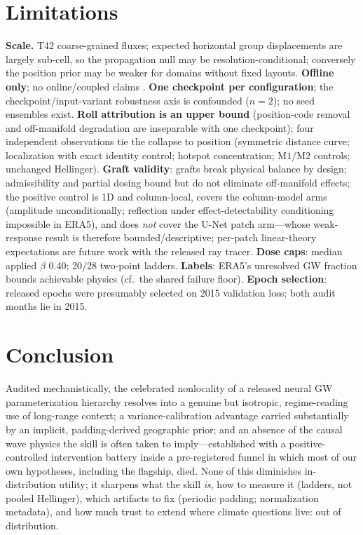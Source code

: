 \documentclass[10pt,twocolumn]{article}
\newcommand{\Mone}{\mathrm{M1}}
\newcommand{\Mtwo}{\mathrm{M2}}
\begin{document}
\section{Limitations}\label{sec:limits}
\textbf{Scale.} T42 coarse-grained fluxes; expected horizontal group displacements are largely sub-cell, so the propagation null may be resolution-conditional; conversely the position prior may be weaker for domains without fixed layouts. \textbf{Offline only}; no online/coupled claims \citep{pahlavan2024}. \textbf{One checkpoint per configuration}; the checkpoint/input-variant robustness axis is confounded ($n{=}2$); no seed ensembles exist. \textbf{Roll attribution is an upper bound} (position-code removal and off-manifold degradation are inseparable with one checkpoint); four independent observations tie the collapse to position (symmetric distance curve; localization with exact identity control; hotspot concentration; $\Mone/\Mtwo$ controls; unchanged Hellinger). \textbf{Graft validity}: grafts break physical balance by design; admissibility and partial dosing bound but do not eliminate off-manifold effects; the positive control is 1D and column-local, covers the column-model arms (amplitude unconditionally; reflection under effect-detectability conditioning impossible in ERA5), and does \emph{not} cover the U-Net patch arm---whose weak-response result is therefore bounded/descriptive; per-patch linear-theory expectations are future work with the released ray tracer. \textbf{Dose caps}: median applied $\beta$ 0.40; 20/28 two-point ladders. \textbf{Labels}: ERA5's unresolved GW fraction bounds achievable physics (cf.\ the shared failure floor). \textbf{Epoch selection}: released epochs were presumably selected on 2015 validation loss; both audit months lie in 2015.

\section{Conclusion}\label{sec:conclusion}
Audited mechanistically, the celebrated nonlocality of a released neural GW parameterization hierarchy resolves into a genuine but isotropic, regime-reading use of long-range context; a variance-calibration advantage carried substantially by an implicit, padding-derived geographic prior; and an absence of the causal wave physics the skill is often taken to imply---established with a positive-controlled intervention battery inside a pre-registered funnel in which most of our own hypotheses, including the flagship, died. None of this diminishes in-distribution utility; it sharpens what the skill \emph{is}, how to measure it (ladders, not pooled Hellinger), which artifacts to fix (periodic padding; normalization metadata), and how much trust to extend where climate questions live: out of distribution.
\end{document}
